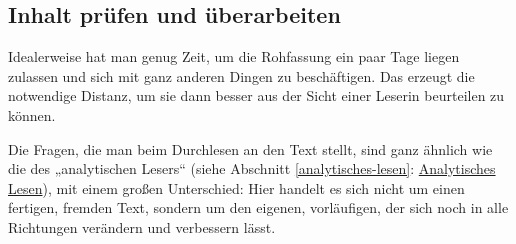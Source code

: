 \documentclass[]{book}
\theoremstyle{definition}
\theoremstyle{definition}
\theoremstyle{definition}
\theoremstyle{remark}
\begin{document}
\subsection{Inhalt prüfen und
überarbeiten}\label{inhalt-prufen-und-uberarbeiten}

Idealerweise hat man genug Zeit, um die Rohfassung ein paar Tage liegen
zulassen und sich mit ganz anderen Dingen zu beschäftigen. Das erzeugt
die notwendige Distanz, um sie dann besser aus der Sicht einer Leserin
beurteilen zu können.

Die Fragen, die man beim Durchlesen an den Text stellt, sind ganz
ähnlich wie die des „analytischen Lesers`` (siehe Abschnitt
\ref{analytisches-lesen}:
\protect\hyperlink{analytisches-lesen}{Analytisches Lesen}), mit einem
großen Unterschied: Hier handelt es sich nicht um einen fertigen,
fremden Text, sondern um den eigenen, vorläufigen, der sich noch in alle
Richtungen verändern und verbessern lässt.
\end{document}
